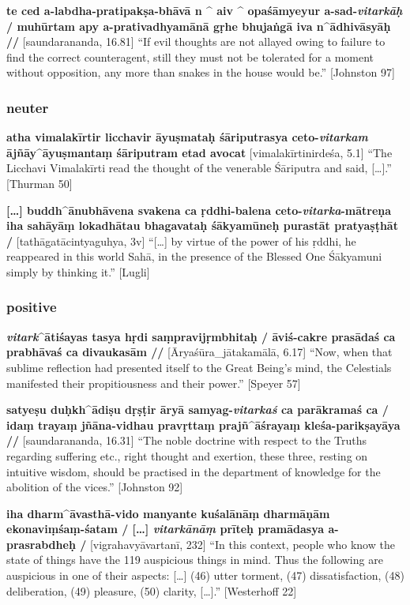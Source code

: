 \documentclass[
  letterpaper,
  DIV=11,
  numbers=noendperiod,
  oneside]{scrreprt}
\begin{document}
\textbf{te ced a-labdha-pratipakṣa-bhāvā n \^{} aiv \^{} opaśāmyeyur
a-sad-\emph{vitarkāḥ} / muhūrtam apy a-prativadhyamānā gṛhe bhujaṅgā iva
n\^{}ādhivāsyāḥ //} {[}saundarananda, 16.81{]} ``If evil thoughts are
not allayed owing to failure to find the correct counteragent, still
they must not be tolerated for a moment without opposition, any more
than snakes in the house would be.'' {[}Johnston 97{]}

\hypertarget{neuter}{%
\subsubsection{neuter}\label{neuter}}

\textbf{atha vimalakīrtir licchavir āyuṣmataḥ śāriputrasya
ceto-\emph{vitarkam} ājñāy\^{}āyuṣmantaṃ śāriputram etad avocat}
{[}vimalakīrtinirdeśa, 5.1{]} ``The Licchavi Vimalakīrti read the
thought of the venerable Śāriputra and said, {[}\ldots{]}.'' {[}Thurman
50{]}

\textbf{{[}\ldots{]} buddh\^{}ānubhāvena svakena ca ṛddhi-balena
ceto-\emph{vitarka}-mātreṇa iha sahāyāṃ lokadhātau bhagavataḥ śākyamūneḥ
purastāt pratyaṣṭhāt /} {[}tathāgatācintyaguhya, 3v{]} ``{[}\ldots{]} by
virtue of the power of his ṛddhi, he reappeared in this world Sahā, in
the presence of the Blessed One Śākyamuni simply by thinking it.''
{[}Lugli{]}

\hypertarget{positive}{%
\subsubsection{positive}\label{positive}}

\textbf{\emph{vitark}\^{}ātiśayas tasya hṛdi saṃpravijṛmbhitaḥ /
āviś-cakre prasādaś ca prabhāvaś ca divaukasām //}
{[}Āryaśūra\_jātakamālā, 6.17{]} ``Now, when that sublime reflection had
presented itself to the Great Being's mind, the Celestials manifested
their propitiousness and their power.'' {[}Speyer 57{]}

\textbf{satyeṣu duḥkh\^{}ādiṣu dṛṣṭir āryā samyag-\emph{vitarkaś} ca
parākramaś ca / idaṃ trayaṃ jñāna-vidhau pravṛttaṃ prajñ\^{}āśrayaṃ
kleśa-parikṣayāya //} {[}saundarananda, 16.31{]} ``The noble doctrine
with respect to the Truths regarding suffering etc., right thought and
exertion, these three, resting on intuitive wisdom, should be practised
in the department of knowledge for the abolition of the vices.''
{[}Johnston 92{]}

\textbf{iha dharm\^{}āvasthā-vido manyante kuśalānāṃ dharmāṇām
ekonaviṃśaṃ-śatam / {[}\ldots{]} \emph{vitarkānāṃ} prīteḥ pramādasya
a-prasrabdheḥ /} {[}vigrahavyāvartanī, 232{]} ``In this context, people
who know the state of things have the 119 auspicious things in mind.
Thus the following are auspicious in one of their aspects: {[}\ldots{]}
(46) utter torment, (47) dissatisfaction, (48) deliberation, (49)
pleasure, (50) clarity, {[}\ldots{]}.'' {[}Westerhoff 22{]}
\end{document}
